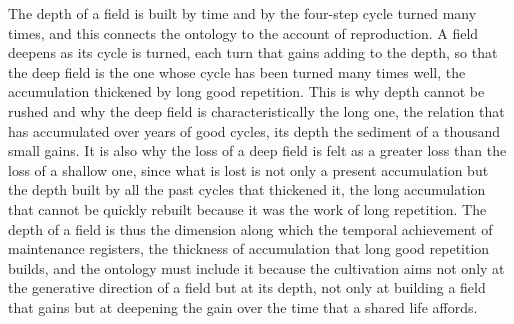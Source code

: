 The depth of a field is built by time and by the four-step cycle turned many times, and this connects the ontology to the account of reproduction. A field deepens as its cycle is turned, each turn that gains adding to the depth, so that the deep field is the one whose cycle has been turned many times well, the accumulation thickened by long good repetition. This is why depth cannot be rushed and why the deep field is characteristically the long one, the relation that has accumulated over years of good cycles, its depth the sediment of a thousand small gains. It is also why the loss of a deep field is felt as a greater loss than the loss of a shallow one, since what is lost is not only a present accumulation but the depth built by all the past cycles that thickened it, the long accumulation that cannot be quickly rebuilt because it was the work of long repetition. The depth of a field is thus the dimension along which the temporal achievement of maintenance registers, the thickness of accumulation that long good repetition builds, and the ontology must include it because the cultivation aims not only at the generative direction of a field but at its depth, not only at building a field that gains but at deepening the gain over the time that a shared life affords.
